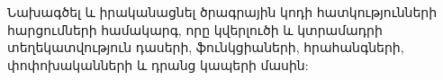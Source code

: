 {
	Նախագծել և իրականացնել ծրագրային կոդի հատկությունների հարցումների համակարգ,
	որը կվերլուծի և կտրամադրի տեղեկատվություն դասերի, ֆունկցիաների,
	հրահանգների, փոփոխականների և դրանց կապերի մասին:
}